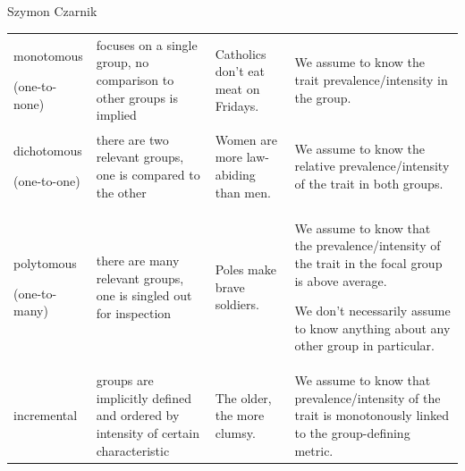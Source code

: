 \begin{artengenv}{Szymon Czarnik}
\begin{table}[H]
\begin{flushleft}
\begin{small}
\begin{tabular}{|L{.19\textwidth}|L{.22\textwidth}|L{.13\textwidth}|L{.28\textwidth}|}
\hline
{} &
 &
 &
\\\hline
monotomous\footnotemark

(one-to-none)
 &
focuses on a single group, no comparison to other groups is implied &
Catholics don't eat meat on Fridays.\vspace*{.5\baselineskip} &
We assume to know the trait prevalence/intensity in the group.\vspace*{.5\baselineskip}\\\hline
dichotomous

(one-to-one) &
there are two relevant groups, one is compared to the other\vspace*{1.5\baselineskip} &
Women are more law-abiding than men. &
We assume to know the relative prevalence/intensity of the trait in both groups.\vspace*{1.5\baselineskip} \\\hline
polytomous

(one-to-many) &
there are many relevant groups, one is singled out for inspection\vspace*{5.5\baselineskip} &
Poles make brave soldiers.\vspace*{6.5\baselineskip} &
We assume to know that the prevalence/intensity of the trait in the focal group is above average.

We don't necessarily assume to know anything about any other group in particular. \\\hline
incremental &
groups are implicitly defined and ordered by intensity of certain characteristic &
The older, the more clumsy.\vspace*{1.5\baselineskip} &
We assume to know that prevalence/intensity of the trait is monotonously linked to the group-defining metric.\\\hline


\end{tabular}
\end{small}
\end{flushleft}
\end{table}
\end{artengenv}

